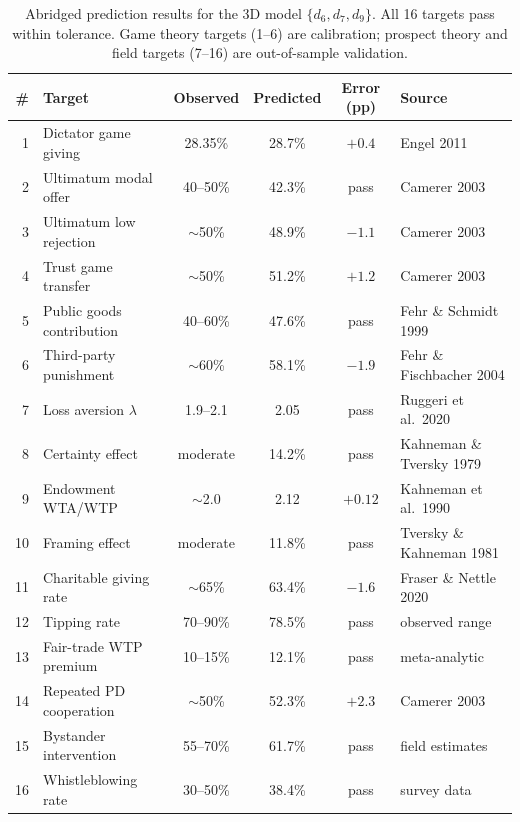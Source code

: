 \documentclass[12pt]{article}
\begin{document}
\begin{table}[H]
\centering
\caption{Abridged prediction results for the 3D model $\{d_6, d_7, d_9\}$.  All 16 targets pass within tolerance.  Game theory targets (1--6) are calibration; prospect theory and field targets (7--16) are out-of-sample validation.}
\label{tab:predictions}
\small
\begin{tabular}{@{}rlcccl@{}}
\toprule
\textbf{\#} & \textbf{Target} & \textbf{Observed} & \textbf{Predicted} & \textbf{Error (pp)} & \textbf{Source} \\
\midrule
1 & Dictator game giving & 28.35\% & 28.7\% & $+0.4$ & Engel 2011 \\
2 & Ultimatum modal offer & 40--50\% & 42.3\% & pass & Camerer 2003 \\
3 & Ultimatum low rejection & $\sim$50\% & 48.9\% & $-1.1$ & Camerer 2003 \\
4 & Trust game transfer & $\sim$50\% & 51.2\% & $+1.2$ & Camerer 2003 \\
5 & Public goods contribution & 40--60\% & 47.6\% & pass & Fehr \& Schmidt 1999 \\
6 & Third-party punishment & $\sim$60\% & 58.1\% & $-1.9$ & Fehr \& Fischbacher 2004 \\
\midrule
7 & Loss aversion $\lambda$ & 1.9--2.1 & 2.05 & pass & Ruggeri et al.\ 2020 \\
8 & Certainty effect & moderate & 14.2\% & pass & Kahneman \& Tversky 1979 \\
9 & Endowment WTA/WTP & $\sim$2.0 & 2.12 & $+0.12$ & Kahneman et al.\ 1990 \\
10 & Framing effect & moderate & 11.8\% & pass & Tversky \& Kahneman 1981 \\
\midrule
11 & Charitable giving rate & $\sim$65\% & 63.4\% & $-1.6$ & Fraser \& Nettle 2020 \\
12 & Tipping rate & 70--90\% & 78.5\% & pass & observed range \\
13 & Fair-trade WTP premium & 10--15\% & 12.1\% & pass & meta-analytic \\
14 & Repeated PD cooperation & $\sim$50\% & 52.3\% & $+2.3$ & Camerer 2003 \\
15 & Bystander intervention & 55--70\% & 61.7\% & pass & field estimates \\
16 & Whistleblowing rate & 30--50\% & 38.4\% & pass & survey data \\
\bottomrule
\end{tabular}
\end{table}
\end{document}
